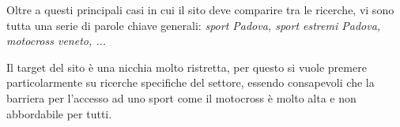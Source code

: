 Oltre a questi principali casi in cui il sito deve comparire tra le ricerche, vi sono tutta una serie di parole chiave generali: \textit{sport Padova, sport estremi Padova, motocross veneto, ...}

Il target del sito è una nicchia molto ristretta, per questo si vuole premere particolarmente su ricerche specifiche del settore, essendo consapevoli che la barriera per l'accesso ad uno sport come il motocross è molto alta e non abbordabile per tutti.



